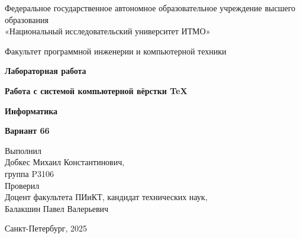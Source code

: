 \documentclass{article}
\begin{document}
\begin{titlepage} %
\centering

{\LARGE Федеральное государственное автономное образовательное учреждение высшего образования\\
«Национальный исследовательский университет ИТМО»\par}
\vspace{1cm}
{\Large Факультет программной инженерии и компьютерной техники\par}

\vfill %

{\Huge \textbf{Лабораторная работа}\par}
\vspace{1em}
{\LARGE \textbf{Работа с системой компьютерной вёрстки \TeX}\par}
{\LARGE \textbf{Информатика}\par}
{\LARGE \textbf{Вариант 66}\par}

\vfill %

\begin{flushright}
\Large
Выполнил\\
Добкес Михаил Константинович,\\
группа P3106\\[1em]
Проверил\\
Доцент факультета ПИиКТ, кандидат технических наук,\\
Балакшин Павел Валерьевич
\end{flushright}

\vspace{1cm}
\Large
Санкт-Петербург, 2025

\end{titlepage}
\end{document}
